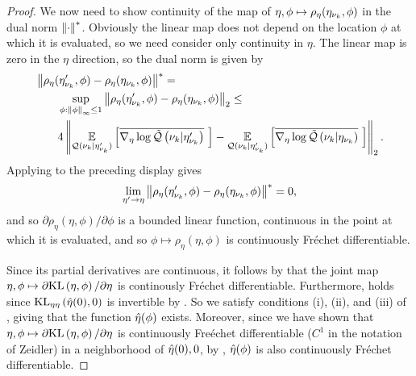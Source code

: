 \begin{proof}
We now need to show continuity of the map of $\eta, \phi \mapsto
\rho_\eta(\eta_{\nu_{k}}, \phi)$ in the dual norm $\left\Vert\cdot\right\Vert^*$.  Obviously the
linear map does not depend on the location $\phi$ at which it is evaluated, so
we need consider only continuity in $\eta$.  The linear map is zero in the
$\eta$ direction, so the dual norm is given by
%
\begin{align*}
%
\MoveEqLeft
\norm{\rho_\eta(\etanuk', \phi) - \rho_\eta(\etanuk, \phi)}^* ={}\\&
\sup_{\phi: \norminf{\phi} \le 1}
    \norm{\rho_\eta(\etanuk', \phi) - \rho_\eta(\etanuk, \phi)}_2 \le{}\\&
4 \norm{
    \expect{\q(\nuk \vert \etanuk')}{\lqgradbar{\nuk \vert \etanuk'}} -
    \expect{\q(\nuk \vert \etanuk')}{\lqgradbar{\nuk \vert \etanuk}}
}_2.
%
\end{align*}
%
Applying  to the preceding display gives
%
\begin{align*}
%
\lim_{\eta' \rightarrow \eta}
    \norm{\rho_\eta(\etanuk', \phi) - \rho_\eta(\etanuk, \phi)}^* = 0,
%
\end{align*}
%
and so $\partial \rho_\eta(\eta, \phi) / \partial \phi$ is a bounded linear
function, continuous in the point at which it is evaluated, and so $\phi \mapsto
\rho_\eta(\eta, \phi)$ is continuously Fr{\'e}chet differentiable.

Since its partial derivatives are continuous, it follows by \citet[Proposition
4.14(c)]{zeidler:2013:functional} that the joint map $\eta, \phi \mapsto
\partial \mathrm{KL}\left(\eta, \phi\right) / \partial \eta$ is continously Fr{\'e}chet
differentiable.  Furthermore, \citet[Chapter 4 Condition
21b]{zeidler:2013:functional} holds since $\mathrm{KL}_{\eta\eta}\left(\hat\eta(0), 0\right)$ is
invertible by .   So we satisfy conditions (i),
(ii), and (iii) of \citet[Theorem 4.B(c)]{zeidler:2013:functional}, giving that
the function $\hat\eta(\phi)$ exists.  Moreover, since we have shown that $\eta,
\phi \mapsto \partial \mathrm{KL}\left(\eta, \phi\right) / \partial \eta$ is continuously
Fre{\'e}chet differentiable ($C^1$ in the notation of Zeidler) in a neighborhood
of $\hat\eta(0), 0$, by \citet[Theorem 4.B(d)]{zeidler:2013:functional},
$\hat\eta(\phi)$ is also continuously Fr{\'e}chet differentiable.


\end{proof}
